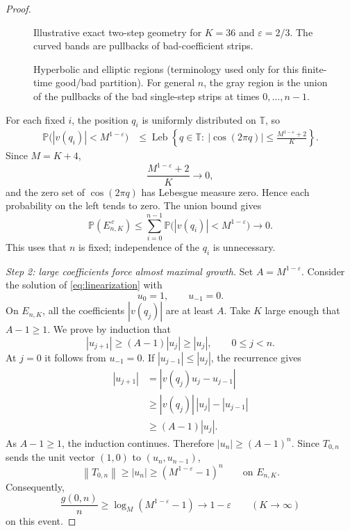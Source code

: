 \documentclass[11pt,a4paper]{article}
\newcommand{\T}{\mathbb{T}}
\newcommand{\PP}{\mathbb{P}}
\newcommand{\norm}[1]{\left\lVert #1\right\rVert}
\begin{document}
\begin{proof}
\begin{figure}[htbp]
\begin{minipage}[c]{0.45\textwidth}
\medskip
\footnotesize Illustrative exact two-step geometry for $K=36$ and
$\varepsilon=2/3$. The curved bands are pullbacks of bad-coefficient strips.
\end{minipage}
\caption{Hyperbolic and elliptic regions (terminology used only for this
finite-time good/bad partition). For general $n$, the gray region is the union
of the pullbacks of the bad single-step strips at times $0,\ldots,n-1$.}
\label{fig:regions}
\end{figure}
For each fixed $i$, the position $q_i$ is uniformly distributed on $\T$, so
\begin{align}
\PP\bigl(|v(q_i)|<M^{1-\varepsilon}\bigr)
&\le\operatorname{Leb}\left\{q\in\T:\ |\cos(2\pi q)|
\le\frac{M^{1-\varepsilon}+2}{K}\right\}.
\end{align}
Since $M=K+4$,
\[
 \frac{M^{1-\varepsilon}+2}{K}\longrightarrow0,
\]
and the zero set of $\cos(2\pi q)$ has Lebesgue measure zero. Hence each probability on the left tends to zero. The union bound gives
\begin{equation}\label{eq:union}
 \PP(E_{n,K}^{\,c})\le\sum_{i=0}^{n-1}
 \PP\bigl(|v(q_i)|<M^{1-\varepsilon}\bigr)\longrightarrow0.
\end{equation}
This uses that $n$ is fixed; independence of the $q_i$ is unnecessary.

\smallskip
\noindent\emph{Step 2: large coefficients force almost maximal growth.}
Set $A=M^{1-\varepsilon}$. Consider the solution of \eqref{eq:linearization} with
\[
 u_0=1,\qquad u_{-1}=0.
\]
On $E_{n,K}$, all the coefficients $|v(q_j)|$ are at least $A$. Take $K$ large enough that $A-1\ge1$. We prove by induction that
\begin{equation}\label{eq:induction}
 |u_{j+1}|\ge(A-1)|u_j|\ge|u_j|,\qquad 0\le j<n.
\end{equation}
At $j=0$ it follows from $u_{-1}=0$. If $|u_{j-1}|\le|u_j|$, the recurrence gives
\begin{align*}
 |u_{j+1}|
 &=|v(q_j)u_j-u_{j-1}|\\
 &\ge |v(q_j)|\,|u_j|-|u_{j-1}|\\
 &\ge(A-1)|u_j|.
\end{align*}
As $A-1\ge1$, the induction continues. Therefore $|u_n|\ge(A-1)^n$. Since $T_{0,n}$ sends the unit vector $(1,0)$ to $(u_n,u_{n-1})$,
\begin{equation}\label{eq:large-transfer}
 \norm{T_{0,n}}\ge |u_n|\ge(M^{1-\varepsilon}-1)^n
 \qquad\text{on }E_{n,K}.
\end{equation}
Consequently,
\begin{equation}\label{eq:finite-lower}
 \frac{g(0,n)}n\ge\log_M(M^{1-\varepsilon}-1)
 \longrightarrow1-\varepsilon
 \qquad(K\to\infty)
\end{equation}
on this event.


\end{proof}
\end{document}
